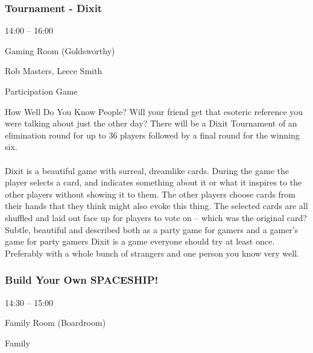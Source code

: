 \documentclass{scrreprt}
\begin{document}
\begin{multicols}{2}
\subsubsection*{Tournament - Dixit}\begin{description}
\setlength{\itemsep}{0pt}
\setlength{\parsep}{0pt}
\setlength{\parskip}{0pt}
\item[Time:]{14:00 -- 16:00}
\item[Venue:]{Gaming Room (Goldsworthy)}
\item[People:]{Rob Masters, Leece Smith}
\item[Tags:]{Participation Game}\end{description}
How Well Do You Know People? Will your friend get that esoteric reference you were talking about just the other day? There will be a Dixit Tournament of an elimination round for up to 36 players followed by a final round for the winning six.\\\\Dixit is a beautiful game with surreal, dreamlike cards. During the game the player selects a card, and indicates something about it or what it inspires to the other players without showing it to them. The other players choose cards from their hands that they think might also evoke this thing. The selected cards are all shuffled and laid out face up for players to vote on – which was the original card? Subtle, beautiful and described both as a party game for gamers and a gamer's game for party gamers Dixit is a game everyone should try at least once. Preferably with a whole bunch of strangers and one person you know very well.
\subsubsection*{Build Your Own SPACESHIP!}\begin{description}
\setlength{\itemsep}{0pt}
\setlength{\parsep}{0pt}
\setlength{\parskip}{0pt}
\item[Time:]{14:30 -- 15:00}
\item[Venue:]{Family Room (Boardroom)}
\item[Tags:]{Family}\end{description}


\end{multicols}
\end{document}

